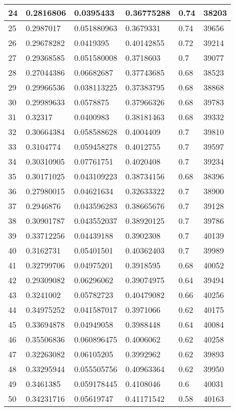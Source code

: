\begin{longtable}{|l|l|l|l|l|l|}
24 & 0.2816806 & 0.0395433 & 0.36775288 & 0.74 & 38203 \\ \hline 
25 & 0.2987017 & 0.051880963 & 0.3679331 & 0.74 & 39656 \\ \hline 
26 & 0.29678282 & 0.0419395 & 0.40142855 & 0.72 & 39214 \\ \hline 
27 & 0.29368585 & 0.051580008 & 0.3718603 & 0.7 & 39077 \\ \hline 
28 & 0.27044386 & 0.06682687 & 0.37743685 & 0.68 & 38523 \\ \hline 
29 & 0.29966536 & 0.038113225 & 0.37383795 & 0.68 & 38868 \\ \hline 
30 & 0.29989633 & 0.0578875 & 0.37966326 & 0.68 & 39783 \\ \hline 
31 & 0.32317 & 0.0400983 & 0.38181463 & 0.68 & 39332 \\ \hline 
32 & 0.30664384 & 0.058588628 & 0.4004409 & 0.7 & 39810 \\ \hline 
33 & 0.3104774 & 0.059458278 & 0.4012755 & 0.7 & 39597 \\ \hline 
34 & 0.30310905 & 0.07761751 & 0.4020408 & 0.7 & 39234 \\ \hline 
35 & 0.30171025 & 0.043109223 & 0.38734156 & 0.68 & 38396 \\ \hline 
36 & 0.27980015 & 0.04621634 & 0.32633322 & 0.7 & 38900 \\ \hline 
37 & 0.2946876 & 0.043596283 & 0.38665676 & 0.7 & 39128 \\ \hline 
38 & 0.30901787 & 0.043552037 & 0.38920125 & 0.7 & 39786 \\ \hline 
39 & 0.33712256 & 0.04439188 & 0.3902308 & 0.7 & 40139 \\ \hline 
40 & 0.3162731 & 0.05401501 & 0.40362403 & 0.7 & 39989 \\ \hline 
41 & 0.32799706 & 0.04975201 & 0.3918595 & 0.68 & 40052 \\ \hline 
42 & 0.29309082 & 0.06296062 & 0.39074975 & 0.64 & 39494 \\ \hline 
43 & 0.3241002 & 0.05782723 & 0.40479082 & 0.66 & 40256 \\ \hline 
44 & 0.34975252 & 0.041587017 & 0.3971066 & 0.62 & 40175 \\ \hline 
45 & 0.33694878 & 0.04949058 & 0.3988448 & 0.64 & 40084 \\ \hline 
46 & 0.35506836 & 0.060896475 & 0.4006062 & 0.62 & 40258 \\ \hline 
47 & 0.32263082 & 0.06105205 & 0.3992962 & 0.62 & 39893 \\ \hline 
48 & 0.33295944 & 0.055505756 & 0.40963364 & 0.62 & 39950 \\ \hline 
49 & 0.3461385 & 0.059178445 & 0.4108046 & 0.6 & 40031 \\ \hline 
50 & 0.34231716 & 0.05619747 & 0.41171542 & 0.58 & 40163 \\ \hline 
\end{longtable}
